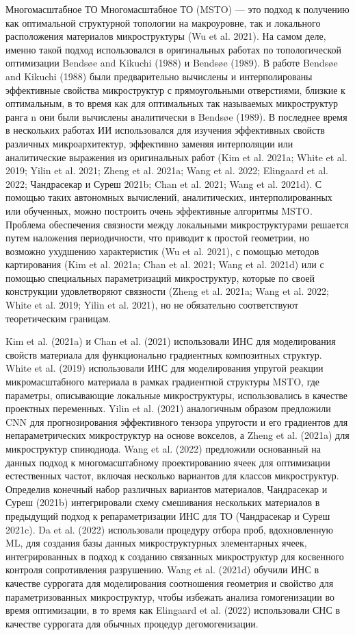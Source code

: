 Многомасштабное ТО Многомасштабное ТО (MSTO) — это подход к получению как оптимальной структурной топологии на макроуровне, так и локального расположения материалов микроструктуры (Wu et al. 2021). На самом деле, именно такой подход использовался в оригинальных работах по топологической оптимизации Bendsøe and Kikuchi (1988) и Bendsøe (1989). В работе Bendsøe and Kikuchi (1988) были предварительно вычислены и интерполированы эффективные свойства микроструктур с прямоугольными отверстиями, близкие к оптимальным, в то время как для оптимальных так называемых микроструктур ранга n они были вычислены аналитически в Bendsøe (1989). В последнее время в нескольких работах ИИ использовался для изучения эффективных свойств различных микроархитектур, эффективно заменяя интерполяции или аналитические выражения из оригинальных работ (Kim et al. 2021a; White et al. 2019; Yilin et al. 2021; Zheng et al. 2021a; Wang et al. 2022; Elingaard et al. 2022; Чандрасекар и Суреш 2021b; Chan et al. 2021; Wang et al. 2021d). С помощью таких автономных вычислений, аналитических, интерполированных или обученных, можно построить очень эффективные алгоритмы MSTO. Проблема обеспечения связности между локальными микроструктурами решается путем наложения периодичности, что приводит к простой геометрии, но возможно ухудшению характеристик (Wu et al. 2021), с помощью методов картирования (Kim et al. 2021a; Chan et al. 2021; Wang et al. 2021d) или с помощью специальных параметризаций микроструктур, которые по своей конструкции удовлетворяют связности (Zheng et al. 2021a; Wang et al. 2022; White et al. 2019; Yilin et al. 2021), но не обязательно соответствуют теоретическим границам.

Kim et al. (2021a) и Chan et al. (2021) использовали ИНС для моделирования свойств материала для функционально градиентных композитных структур. White et al. (2019) использовали ИНС для моделирования упругой реакции микромасштабного материала в рамках градиентной структуры MSTO, где параметры, описывающие локальные микроструктуры, использовались в качестве проектных переменных. Yilin et al. (2021) аналогичным образом предложили CNN для прогнозирования эффективного тензора упругости и его градиентов для непараметрических микроструктур на основе вокселов, а Zheng et al. (2021a) для микроструктур спинодиода. Wang et al. (2022) предложили основанный на данных подход к многомасштабному проектированию ячеек для оптимизации естественных частот, включая несколько вариантов для классов микроструктур. Определив конечный набор различных вариантов материалов, Чандрасекар и Суреш (2021b) интегрировали схему смешивания нескольких материалов в предыдущий подход к репараметризации ИНС для ТО (Чандрасекар и Суреш 2021c). Da et al. (2022) использовали процедуру отбора проб, вдохновленную ML, для создания базы данных микроструктурных элементарных ячеек, интегрированных в подход к созданию связанных микроструктур для косвенного контроля сопротивления разрушению. Wang et al. (2021d) обучили ИНС в качестве суррогата для моделирования соотношения геометрия и свойство для параметризованных микроструктур, чтобы избежать анализа гомогенизации во время оптимизации, в то время как Elingaard et al. (2022) использовали СНС в качестве суррогата для обычных процедур дегомогенизации.

